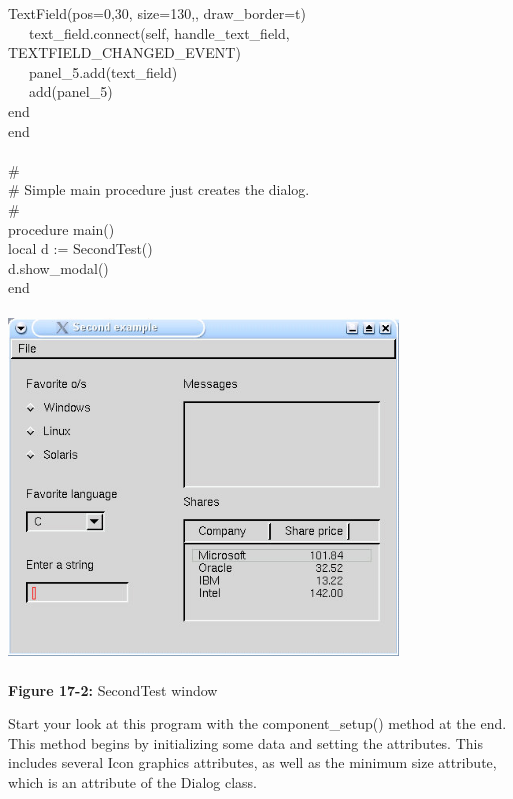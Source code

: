 {TextField({\textquotedbl}pos=0,30{\textquotedbl},
{\textquotedbl}size=130,{\textquotedbl},
{\textquotedbl}draw\_border=t{\textquotedbl}) \\
\>   \ \ \ text\_field.connect(self,
{\textquotedbl}handle\_text\_field{\textquotedbl},
TEXTFIELD\_CHANGED\_EVENT) \\
\>   \ \ \ panel\_5.add(text\_field) \\
\>   \ \ \ add(panel\_5) \\
\>   end \\
end \\
\ \\
\# \\
\# Simple main procedure just creates the dialog. \\
\# \\
procedure main() \\
\>   local d := SecondTest() \\
\>   d.show\_modal() \\
end
}

\bigskip

\begin{center}
\includegraphics[width=4.0756in,height=3.6465in]{ub-img/ub-img51.jpg}
\end{center}

{\sffamily\bfseries Figure 17-2:}
{\sffamily SecondTest window}

\bigskip

Start your look at this program with the \textsf{component\_setup()}
method at the end. This method begins by initializing some data and
setting the attributes. This includes several Icon graphics attributes,
as well as the minimum size attribute, which is an attribute of the
\textsf{Dialog} class.

